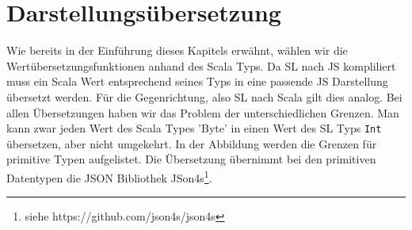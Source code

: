 \documentclass[12pt]{scrreprt}
\begin{document}

\section{Darstellungsübersetzung}

Wie bereits in der Einführung dieses Kapitels erwähnt, wählen wir die Wertübersetzungsfunktionen anhand des Scala Typs. Da \ac{SL} nach \ac{JS} kompliliert muss ein Scala Wert entsprechend seines Typs in eine passende \ac{JS} Darstellung übersetzt werden. Für die Gegenrichtung, also \ac{SL} nach Scala gilt dies analog. Bei allen Übersetzungen haben wir das Problem der unterschiedlichen Grenzen. Man kann zwar jeden Wert des Scala Types 'Byte' in einen Wert des \ac{SL} Typs \lstinline!Int! übersetzen, aber nicht umgekehrt. In der Abbildung  werden die Grenzen für primitive Typen aufgelistet. Die Übersetzung übernimmt bei den primitiven Datentypen die JSON Bibliothek JSon4s\footnote{siehe https://github.com/json4s/json4s}.
\end{document}
